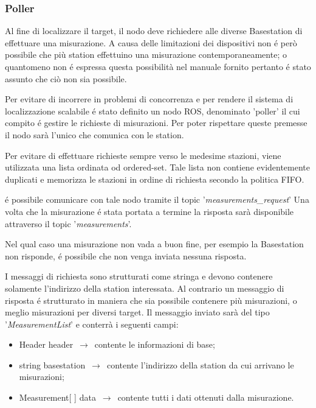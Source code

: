 \documentclass{article}
\begin{document}
\subsubsection{Poller}

Al fine di localizzare il target, il nodo deve richiedere alle diverse Basestation di effettuare una misurazione. 
A causa delle limitazioni dei dispositivi non \'e per\`o possibile che pi\`u station effettuino una misurazione contemporaneamente; o quantomeno non \'e espressa questa possibilit\`a nel manuale fornito pertanto \'e stato assunto che ci\`o non sia possibile.

Per evitare di incorrere in problemi di concorrenza e per rendere il sistema di localizzazione scalabile \'e stato definito un nodo ROS, denominato 'poller' il cui compito \'e gestire le richieste di misurazioni.
Per poter rispettare queste premesse il nodo sar\`a l'unico che comunica con le station.

Per evitare di effettuare richieste sempre verso le medesime stazioni, viene utilizzata una lista ordinata od ordered-set.
Tale lista non contiene evidentemente duplicati e memorizza le stazioni in ordine di richiesta secondo la politica FIFO.

\'e possibile comunicare con tale nodo tramite il topic '\textit{measurements\_request}' 
Una volta che la misurazione \'e stata portata a termine la risposta sar\`a disponibile attraverso il topic '\textit{measurements}'.

Nel qual caso una misurazione non vada a buon fine, per esempio la Basestation non risponde, \'e possibile che non venga inviata nessuna risposta.

I messaggi di richiesta sono strutturati come stringa e devono contenere solamente l'indirizzo della station interessata.
Al contrario un messaggio di risposta \'e strutturato in maniera che sia possibile contenere pi\`u misurazioni, o meglio misurazioni per diversi target.
Il messaggio inviato sar\`a del tipo '\textit{MeasurementList}' e conterr\`a i seguenti campi:

\begin{itemize}
	\item Header header $\,\to\,$ contente le informazioni di base;
	\item string basestation $\,\to\,$ contente l'indirizzo della station da cui arrivano le misurazioni;
	\item Measurement[ ] data $\,\to\,$ contente tutti i dati ottenuti dalla misurazione.
\end{itemize}
\end{document}
